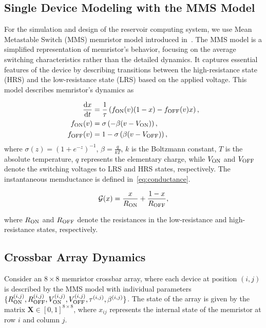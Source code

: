 \documentclass[11pt, oneside]{article}
\begin{document}
\subsection{Single Device Modeling with the MMS Model}

For the simulation and design of the reservoir computing system, we use Mean Metastable Switch (MMS) memristor model introduced in~\cite{Molter2016, Minati2020}. The MMS model is a simplified representation of memristor's behavior, focusing on the average switching characteristics rather than the detailed dynamics. It captures essential features of the device by describing transitions between the high-resistance state (HRS) and the low-resistance state (LRS) based on the applied voltage. This model describes memristor's dynamics as


\begin{align}
  \label{eq:mms}
  \frac{{\rm d} {x}}{{\rm d} t}       & = \frac{1}{\tau} \left( f_{\rm ON}(v) (1-x) - f_{\rm OFF}(v) x \right),              \\
  f_{\rm ON}(v)  & = \sigma\left(-\beta (v-V_{\rm ON})\right) \label{eq:mms5b},      \\
  f_{\rm OFF}(v) & = 1 - \sigma\left(\beta (v-V_{\rm OFF})\right)  \label{eq:mms5c}, 
\end{align}
where \(\sigma(z) = (1+e^{-z})^{-1}\), \(\beta= \frac{q}{kT}\), \(k\) is the Boltzmann constant, \(T\) is the absolute temperature, \(q\) represents the elementary charge, while \(V_{\rm ON}\) and \(V_{\rm OFF}\) denote the switching voltages to LRS and HRS states, respectively. The instantaneous memductance is defined in~\eqref{eq:conductance}.

\begin{equation}
  \mathcal{G}(x) = \frac{x}{R_{\rm ON}} + \frac{1 - x}{R_{\rm OFF}},
  \label{eq:conductance}
\end{equation}

where \(R_{\rm ON}\) and \(R_{\rm OFF}\) denote the resistances in the low-resistance and high-resistance states, respectively.


\subsection{Crossbar Array Dynamics}

Consider an \(8 \times 8\) memristor crossbar array, where each device at position \((i,j)\) is described by the MMS model with individual parameters \(\{R_{\rm ON}^{(i,j)}, R_{\rm OFF}^{(i,j)}, V_{\rm ON}^{(i,j)}, V_{\rm OFF}^{(i,j)}, \tau^{(i,j)}, \beta^{(i,j)}\}\). The state of the array is given by the matrix \(\mathbf{X} \in [0,1]^{8 \times 8}\), where \(x_{ij}\) represents the internal state of the memristor at row \(i\) and column \(j\).
\end{document}
